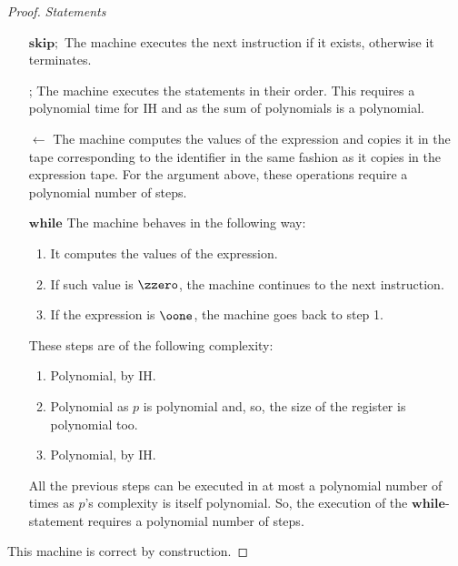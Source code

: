 \begin{proof}
\emph{Statements}
\begin{itemize}
\item[$\mathbf{skip};$]
The machine executes the next instruction if it exists,
otherwise it terminates.

\item[;] The machine executes the statements in their order.
This requires a polynomial time for IH and
as the sum of polynomials
is a polynomial.

\item[$\leftarrow$] The machine computes the
values of the expression
and copies {it} in the tape
corresponding to the identifier in the same
fashion as it copies in the expression tape.
For the argument above, these operations
require a polynomial number of steps.

\item[$\mathbf{while}$]
The machine behaves in the following
way:
\begin{enumerate}
\itemsep0em
\item It computes the values of the expression.
\item If such value is {$\zzero$},
{the machine} continues to the next instruction.
\item If the expression is {$\oone$},
the machine goes back to step 1.
\end{enumerate}
These steps are of the following complexity:
\begin{enumerate}
\item Polynomial, by IH.
\item Polynomial as $p$ is polynomial and, so,
the size of the register is polynomial too.
\item Polynomial, by IH.
\end{enumerate}
All the previous steps can be executed {in}
at most a polynomial number of times
as $p$'s complexity is itself polynomial.
So, the execution of the
{$\mathbf{while}$}-statement requires
a polynomial number of steps.
\end{itemize}
This machine is correct by construction.
\end{proof}
